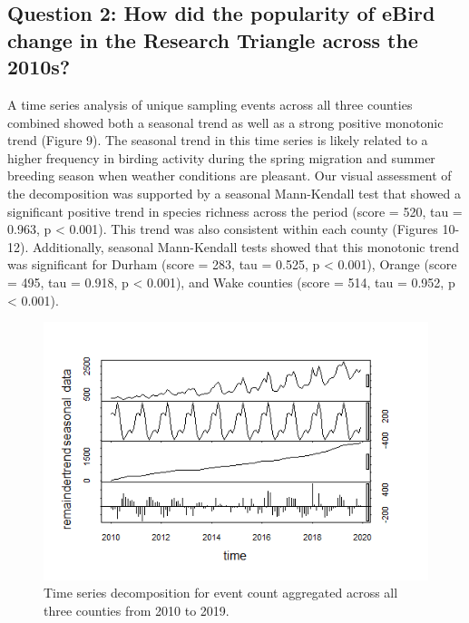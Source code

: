 \documentclass[
  12pt,
]{article}
\begin{document}
\hypertarget{question-2-how-did-the-popularity-of-ebird-change-in-the-research-triangle-across-the-2010s}{%
\subsection{Question 2: How did the popularity of eBird change in the
Research Triangle across the
2010s?}\label{question-2-how-did-the-popularity-of-ebird-change-in-the-research-triangle-across-the-2010s}}

A time series analysis of unique sampling events across all three
counties combined showed both a seasonal trend as well as a strong
positive monotonic trend (Figure 9). The seasonal trend in this time
series is likely related to a higher frequency in birding activity
during the spring migration and summer breeding season when weather
conditions are pleasant. Our visual assessment of the decomposition was
supported by a seasonal Mann-Kendall test that showed a significant
positive trend in species richness across the period (score = 520, tau =
0.963, p \textless{} 0.001). This trend was also consistent within each
county (Figures 10-12). Additionally, seasonal Mann-Kendall tests showed
that this monotonic trend was significant for Durham (score = 283, tau =
0.525, p \textless{} 0.001), Orange (score = 495, tau = 0.918, p
\textless{} 0.001), and Wake counties (score = 514, tau = 0.952, p
\textless{} 0.001).

\begin{figure}
\centering
\includegraphics{./Output/RT_event_ts_decomp.png}
\caption{Time series decomposition for event count aggregated across all
three counties from 2010 to 2019.}
\end{figure}
\end{document}
